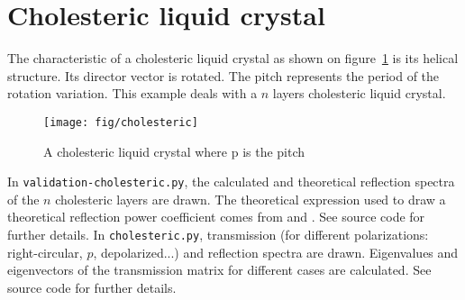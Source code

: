\section{Cholesteric liquid crystal}
The characteristic of a cholesteric liquid crystal as shown on figure~\ref{fig:cholesteric} is its helical structure. Its director vector is rotated. The pitch represents the period of the rotation variation.
This example deals with a $n$ layers cholesteric liquid crystal.
\begin{figure}[H]
\begin{center}
\texttt{[image: fig/cholesteric]}
\end{center}
\caption{\label{fig:cholesteric}A cholesteric liquid crystal where p is the pitch}
\end{figure}
In \verb/validation-cholesteric.py/, the calculated and theoretical reflection spectra of the $n$ cholesteric layers are drawn. The theoretical expression used to draw a theoretical reflection power coefficient comes from \cite{Wu} and \cite{Chandrasekhar}. See source code for further details. In \verb/cholesteric.py/, transmission (for different polarizations: right-circular, $p$, depolarized...) and reflection spectra are drawn. Eigenvalues and eigenvectors of the transmission matrix for different cases are calculated. See source code for further details. 


